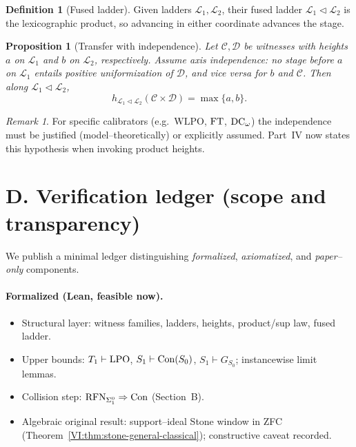 \documentclass[11pt]{article}
\newtheorem{proposition}[theorem]{Proposition}
\theoremstyle{definition}
\newtheorem{definition}[theorem]{Definition}
\theoremstyle{remark}
\newtheorem{remark}[theorem]{Remark}
\newcommand{\WLPO}{\mathrm{WLPO}}
\begin{document}
\begin{definition}[Fused ladder]
Given ladders $\mathcal L_1,\mathcal L_2$, their fused ladder $\mathcal L_1\triangleleft\mathcal L_2$ is the lexicographic product, so advancing in either coordinate advances the stage.
\end{definition}

\begin{proposition}[Transfer with independence]\label{VI:prop:transfer-indep}
Let $\mathcal C,\mathcal D$ be witnesses with heights $a$ on $\mathcal L_1$ and $b$ on $\mathcal L_2$, respectively. Assume \emph{axis independence}: no stage before $a$ on $\mathcal L_1$ entails positive uniformization of $\mathcal D$, and vice versa for $b$ and $\mathcal C$. Then along $\mathcal L_1\triangleleft\mathcal L_2$,
\[
h_{\mathcal L_1\triangleleft\mathcal L_2}(\mathcal C\times \mathcal D)=\max\{a,b\}.
\]
\end{proposition}

\begin{remark}
For specific calibrators (e.g.\ $\WLPO$, $\mathrm{FT}$, $\mathrm{DC}_\omega$) the independence must be justified (model–theoretically) or explicitly assumed. Part~IV now states this hypothesis when invoking product heights.
\end{remark}

\section{D. Verification ledger (scope and transparency)}

We publish a minimal ledger distinguishing \emph{formalized}, \emph{axiomatized}, and \emph{paper–only} components.

\paragraph{Formalized (Lean, feasible now).}
\begin{itemize}
\item Structural layer: witness families, ladders, heights, product/sup law, fused ladder.
\item Upper bounds: $T_1\vdash\mathrm{LPO}$, $S_1\vdash\mathrm{Con}(S_0)$, $S_1\vdash G_{S_0}$; instancewise limit lemmas.
\item Collision step: \(\mathrm{RFN}_{\Sigma^0_1}\Rightarrow \mathrm{Con}\) (Section~B).
\item Algebraic original result: support–ideal Stone window in ZFC (Theorem~\ref{VI:thm:stone-general-classical}); constructive caveat recorded.
\end{itemize}
\end{document}
